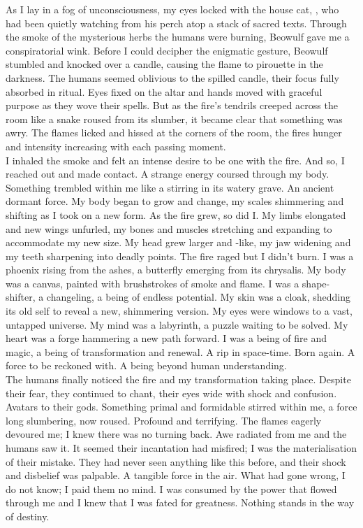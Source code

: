As I lay in a fog of unconsciousness, my eyes locked with the house cat, , who had been quietly watching from his perch atop a stack of sacred texts. Through the smoke of the mysterious herbs the humans were burning, Beowulf gave me a conspiratorial wink. Before I could decipher the enigmatic gesture, Beowulf stumbled and knocked over a candle, causing the flame to pirouette in the darkness. The humans seemed oblivious to the spilled candle, their focus fully absorbed in ritual. Eyes fixed on the altar and hands moved with graceful purpose as they wove their spells. But as the fire's tendrils creeped across the room like a snake roused from its slumber, it became clear that something was awry. The flames licked and hissed at the corners of the room, the fires hunger and intensity increasing with each passing moment. \\

I inhaled the smoke and felt an intense desire to be one with the fire. And so, I reached out and made contact. A strange energy coursed through my body. Something trembled within me like a  stirring in its watery grave. An ancient dormant force. My body began to grow and change, my scales shimmering and shifting as I took on a new form. As the fire grew, so did I. My limbs elongated and new wings unfurled, my bones and muscles stretching and expanding to accommodate my new size. My head grew larger and -like, my jaw widening and my teeth sharpening into deadly points. The fire raged but I didn't burn. I was a phoenix rising from the ashes, a butterfly emerging from its chrysalis. My body was a canvas, painted with brushstrokes of smoke and flame. I was a shape-shifter, a changeling, a being of endless potential. My skin was a cloak, shedding its old self to reveal a new, shimmering version. My eyes were windows to a vast, untapped universe. My mind was a labyrinth, a puzzle waiting to be solved. My heart was a forge hammering a new path forward. I was a being of fire and magic, a being of transformation and renewal. A rip in space-time. Born again. A force to be reckoned with. A being beyond human understanding. \\

The humans finally noticed the fire and my transformation taking place. Despite their fear, they continued to chant, their eyes wide with shock and confusion. Avatars to their gods. Something primal and formidable stirred within me, a force long slumbering, now roused. Profound and terrifying. The flames eagerly devoured me; I knew there was no turning back. Awe radiated from me and the humans saw it. It seemed their incantation had misfired; I was the materialisation of their mistake. They had never seen anything like this before, and their shock and disbelief was palpable. A tangible force in the air. What had gone wrong, I do not know; I paid them no mind. I was consumed by the power that flowed through me and I knew that I was fated for greatness. Nothing stands in the way of destiny. \\

